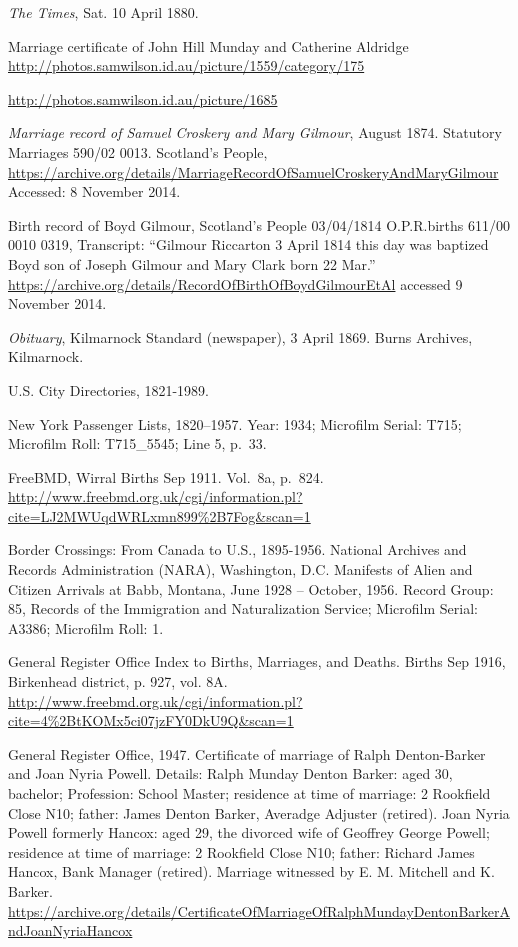 \begin{thebibliography}{99}
	\emph{The Times}, Sat. 10 April 1880. 

	Marriage certificate of John Hill Munday and Catherine Aldridge
	\url{http://photos.samwilson.id.au/picture/1559/category/175}

	\url{http://photos.samwilson.id.au/picture/1685}

	\emph{Marriage record of Samuel Croskery and Mary Gilmour}, August 1874.
	Statutory Marriages 590/02 0013. Scotland's People,
	\url{https://archive.org/details/MarriageRecordOfSamuelCroskeryAndMaryGilmour}
	Accessed: 8 November 2014.

	Birth record of Boyd Gilmour,
	Scotland's People 03/04/1814 O.P.R.births 611/00 0010 0319,
	Transcript: ``Gilmour Riccarton 3 April 1814 this day was baptized Boyd son of Joseph Gilmour and Mary Clark born 22 Mar.''
	\url{https://archive.org/details/RecordOfBirthOfBoydGilmourEtAl} accessed 9 November 2014.

	\emph{Obituary}, Kilmarnock Standard (newspaper), 3 April 1869. Burns Archives, Kilmarnock.

	U.S. City Directories, 1821-1989.

	New York Passenger Lists, 1820--1957. Year: 1934; Microfilm Serial: T715; Microfilm Roll: T715\_5545; Line 5, p.\ 33.

	FreeBMD, Wirral Births Sep 1911. Vol.\ 8a, p.\ 824.
	\url{http://www.freebmd.org.uk/cgi/information.pl?cite=LJ2MWUqdWRLxmn899\%2B7Fog&scan=1}

	Border Crossings: From Canada to U.S., 1895-1956.
	National Archives and Records Administration (NARA), Washington, D.C.
	Manifests of Alien and Citizen Arrivals at Babb, Montana, June 1928 -- October, 1956.
	Record Group: 85, Records of the Immigration and Naturalization Service; Microfilm Serial: A3386; Microfilm Roll: 1.

	General Register Office Index to Births, Marriages, and Deaths.
	Births Sep 1916, Birkenhead district, p. 927, vol. 8A.
	\url{http://www.freebmd.org.uk/cgi/information.pl?cite=4\%2BtKOMx5ci07jzFY0DkU9Q&scan=1}

	General Register Office, 1947. Certificate of marriage of Ralph Denton-Barker and Joan Nyria Powell.
	Details: Ralph Munday Denton Barker: aged 30, bachelor; Profession: School Master;
	residence at time of marriage: 2 Rookfield Close N10; father: James Denton Barker, Averadge Adjuster (retired).
	Joan Nyria Powell formerly Hancox: aged 29, the divorced wife of Geoffrey George Powell;
	residence at time of marriage: 2 Rookfield Close N10; father: Richard James Hancox, Bank Manager (retired).
	Marriage witnessed by E. M. Mitchell and K. Barker.
	\url{https://archive.org/details/CertificateOfMarriageOfRalphMundayDentonBarkerAndJoanNyriaHancox}


\end{thebibliography}
